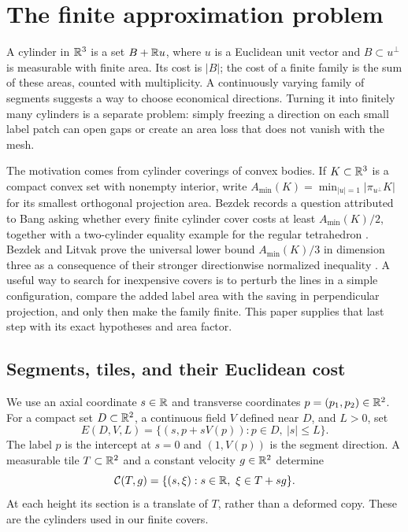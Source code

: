 \section{The finite approximation problem}\label{b:introduction}
A cylinder in $\mathbb R^3$ is a set $B+\mathbb R u$, where $u$ is a Euclidean unit
vector and $B\subset u^\perp$ is measurable with finite area. Its cost is
$|B|$; the cost of a finite family is the sum of these areas, counted with
multiplicity. A continuously varying family of segments suggests a way to
choose economical directions. Turning it into finitely many cylinders is
a separate problem: simply freezing a direction on each small label patch
can open gaps or create an area loss that does not vanish with the mesh.

The motivation comes from cylinder coverings of convex bodies. If
$K\subset\mathbb R^3$ is a compact convex set with nonempty interior, write
$A_{\min}(K)=\min_{|u|=1}|\pi_{u^\perp}K|$ for its smallest orthogonal
projection area. Bezdek records a question attributed to Bang asking
whether every finite cylinder cover costs at least $A_{\min}(K)/2$, together
with a two-cylinder equality example for the regular tetrahedron
\cite[Problem~3.1]{Bezdek2009}. Bezdek and Litvak prove the universal
lower bound $A_{\min}(K)/3$ in dimension three as a consequence of their
stronger directionwise normalized inequality
\cite[Theorem~3.1]{BL2009}. A useful way to search for inexpensive covers is
to perturb the lines in a simple configuration, compare the added label
area with the saving in perpendicular projection, and only then make the
family finite. This paper supplies that last step with its exact
hypotheses and area factor.

\subsection{Segments, tiles, and their Euclidean cost}
We use an axial coordinate $s\in\mathbb R$ and transverse coordinates
$p=(p_1,p_2)\in\mathbb R^2$. For a compact set $D\subset\mathbb R^2$, a continuous
field $V$ defined near $D$, and $L>0$, set
\begin{equation}\label{b:ruled-set}
 E(D,V,L)=\{(s,p+sV(p)):p\in D,\ |s|\le L\}.
\end{equation}
The label $p$ is the intercept at $s=0$ and $(1,V(p))$ is the
segment direction. A measurable tile $T\subset\mathbb R^2$ and a constant
velocity $g\in\mathbb R^2$ determine
\[
 \mathcal C(T,g)=\{(s,\xi):s\in\mathbb R,\ \xi\in T+sg\}.
\]
At each height its section is a translate of $T$, rather than a deformed
copy. These are the cylinders used in our finite covers.

